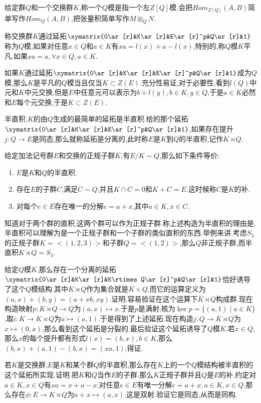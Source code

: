 给定群$Q$和一个交换群$K$,称一个$Q$模是指一个左$Z[Q]$模.会把$Hom_ {Z[Q]}(A,B)$简单写作$Hom_Q(A,B)$,把张量积简单写作$M\otimes_QN$.

称交换群$K$通过延拓$\xymatrix{0\ar[r]&K\ar[r]&E\ar[r]^p&Q\ar[r]&1}$称为$Q$模,如果对任意$x\in Q$和$a\in K$有$xa=l(x)+a-l(x)$,特别的,称$Q$模$K$平凡,如果$xa=a,\forall x\in Q,a\in K$.

如果$K$通过延拓$\xymatrix{0\ar[r]&K\ar[r]&E\ar[r]^p&Q\ar[r]&1}$成为$Q$模,那么$K$是平凡的$Q$模当且仅当$K\subset Z(E)$.充分性易证,对于必要性,看到$l(Q)$中元和$K$中元交换,但是$E$中任意元可以表示为$b+l(y),b\in K,y\in Q$,于是$a\in K$必然和$E$每个元交换,于是$K\subset Z(E)$.

半直积.$K$的由$Q$生成的最简单的延拓是半直积.给的那个延拓$\xymatrix{0\ar[r]&K\ar[r]&E\ar[r]^p&Q\ar[r]&1}$,如果存在提升$j:Q\to E$是同态,那么就称延拓是分离的,此时称$E$是$K$到$Q$的半直积,记作$K \rtimes Q$.

给定加法记号群$E$和交换的正规子群$K$,有$E/K\sim Q$,那么如下条件等价:
\begin{enumerate}
	\item $E$是$K$和$Q$的半直积.
	\item 存在$E$的子群$C$,满足$C\sim Q$,并且$K\cap C=0$和$K+C=E$.这时候称$C$是$K$的补.
	\item 对每个$e\in E$存在唯一的分解$e=a+x$,其中$a\in K,x\in C$.
\end{enumerate}

知道对于两个群的直积,这两个群可以作为正规子群.称上述构造为半直积的理由是,半直积可以理解为是一个正规子群和一个子群的类似直积的东西.举例来讲,考虑$S_3$的正规子群$K=<(1,2,3)>$和子群$Q=<(1,2)>$,那么$Q$非正规子群,而半直积$K\rtimes Q=S_3$.

给定$Q$模$K$,那么存在一个分离的延拓$\xymatrix{0\ar[r]&K\ar[r]&K\rtimes Q\ar[r]^p&Q\ar[r]&1}$恰好诱导了这个$Q$模结构.其中$K\rtimes Q$作为集合就是$K\times Q$,而它的运算定义为$(a,x)+(b,y)=(a+xb,xy)$.证明.容易验证在这个运算下$K\rtimes Q$构成群.现在构造映射$p:K\rtimes Q\to Q$为$(a,x)\mapsto x$.于是$p$是满射,核为$\ker p=\{(a,1)\mid a\in K\}$,取$i:K\to K\rtimes Q$为$a\mapsto (a,1)$.于是得到了上述延拓.现在构造$j:Q\to K\rtimes Q$为$x\mapsto(0,x)$,那么看到这个延拓是分裂的.最后验证这个延拓诱导了$Q$模$K$.若$x\in Q$,那么$x$的每个提升都有形式$l(x)=(b,x),b\in K$,那么$(b,x)+(a,1)-(b,x)=(xa,1)$,得证.

若$K$是交换群,$E$是$K$和某个群$Q$的半直积,那么存在$K$上的一个$Q$模结构被半直积的这个延拓所实现.证明.把$K$和$Q$当作$E$的子群.那么$K$正规子群并且$Q$是$E$的补.约定对$a\in K,x\in Q$有$xa=x+a-x$.对任意$e\in E$有唯一分解$e=a+x,a\in K,x\in Q$.那么存在$\phi:E\to K\rtimes Q$为$a+x\mapsto (a,x)$.这是双射.验证它是同态,从而是同构.


